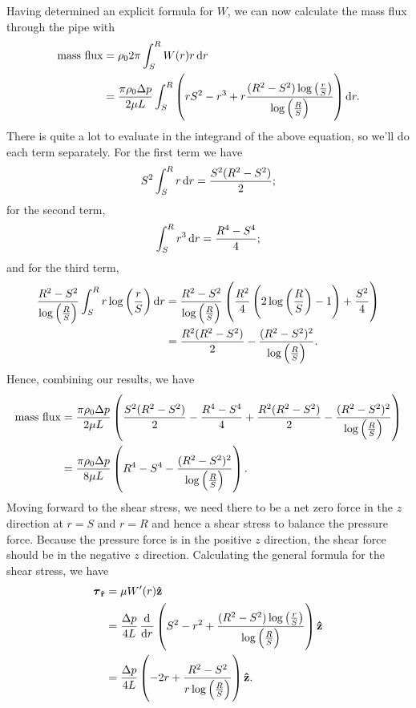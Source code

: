\documentclass{article}
\newcommand{\rhat}{\mathbf{\hat{r}}}
\newcommand{\zhat}{\mathbf{\hat{z}}}
\newcommand{\tauvec}{\boldsymbol{\tau}}
\begin{document}
Having determined an explicit formula for $W$, we can now calculate the
mass flux through the pipe with
%
\begin{align*}
    \text{mass flux}
        &= \rho_0 2 \pi \int_S^R W(r) r \dif r \\
        &= \frac{\pi \rho_0 \Delta p}{2 \mu L}
            \int_S^R
                \del{r S^2 - r^3 + r \frac{(R^2 - S^2) \log\del{\frac{r}{S}}}{\log\del{\frac{R}{S}}}}
            \dif r
        .
\end{align*}
%
There is quite a lot to evaluate in the integrand of the above equation,
so we'll do each term separately. For the first term we have
%
\begin{equation*}
    S^2  \int_S^R r \dif r = \frac{S^2 (R^2 - S^2)}{2}
    ;
\end{equation*}
%
for the second term,
%
\begin{equation*}
    \int_S^R r^3 \dif r = \frac{R^4 - S^4}{4}
    ;
\end{equation*}
%
and for the third term,
%
\begin{align*}
    \frac{R^2 - S^2}{\log\del{\frac{R}{S}}}
    \int_S^R r \log\del{\frac{r}{S}} \dif r
    &=
    \frac{R^2 - S^2}{\log\del{\frac{R}{S}}}
    \del{\frac{R^2}{4} \del{2 \log\del{\frac{R}{S}} - 1} + \frac{S^2}{4}}
    \\
    &= \frac{R^2 (R^2 - S^2)}{2} - \frac{(R^2 - S^2)^2}{\log\del{\frac{R}{S}}}
    .
\end{align*}
%
Hence, combining our results, we have
%
\begin{align*}
    \text{mass flux}
        &= \frac{\pi \rho_0 \Delta p}{2 \mu L}
            \del{
                \frac{S^2 (R^2 - S^2)}{2}
                - \frac{R^4 - S^4}{4}
                + \frac{R^2 (R^2 - S^2)}{2}
                - \frac{(R^2 - S^2)^2}{\log\del{\frac{R}{S}}}
            } \\
        &= \frac{\pi \rho_0 \Delta p}{8 \mu L}
            \del{
                R^4 - S^4
                - \frac{(R^2 - S^2)^2}{\log\del{\frac{R}{S}}}
            }
      .
\end{align*}
%
Moving forward to the shear stress, we need there to be a net zero force
in the $z$ direction at $r = S$ and $r = R$ and hence a shear stress to
balance the pressure force. Because the pressure force is in the
positive $z$ direction, the shear force should be in the negative $z$
direction. Calculating the general formula for the shear stress, we have
%
\begin{align*}
    \tauvec_\rhat
        &= \mu W^\prime(r) \zhat \\
        &= \frac{\Delta p}{4 L} \dod{}{r} \del{S^2 - r^2 + \frac{(R^2 - S^2) \log\del{\frac{r}{S}}}{\log\del{\frac{R}{S}}}} \zhat \\
        &= \frac{\Delta p}{4 L} \del{- 2 r + \frac{R^2 - S^2}{r \log\del{\frac{R}{S}}}} \zhat
        .
\end{align*}
\end{document}
